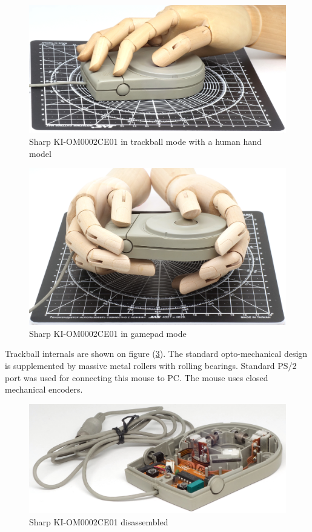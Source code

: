 \documentclass[11pt, a4paper]{article}
\begin{document}
\begin{figure}[h]
    \centering
    \includegraphics[scale=0.45]{1987_sharp_convertible/handball_30.jpg}
    \caption{Sharp KI-OM0002CE01 in trackball mode with a human hand model}
    \label{fig:SharpConvertibleBallHand}
\end{figure}

\begin{figure}[h]
    \centering
    \includegraphics[scale=0.31]{1987_sharp_convertible/handpad_30.jpg}
    \caption{Sharp KI-OM0002CE01 in gamepad mode}
    \label{fig:SharpConvertiblePadHand}
\end{figure}


Trackball internals are shown on figure (\ref{fig:SharpConvertibleInside}). The standard opto-mechanical design is supplemented by massive metal rollers with rolling bearings. Standard PS/2 port was used for connecting this mouse to PC.
The mouse uses closed mechanical encoders. 
\begin{figure}[h]
    \centering
    \includegraphics[scale=0.7]{1987_sharp_convertible/inside_30.jpg}
    \caption{Sharp KI-OM0002CE01 disassembled}
    \label{fig:SharpConvertibleInside}
\end{figure}
\end{document}
